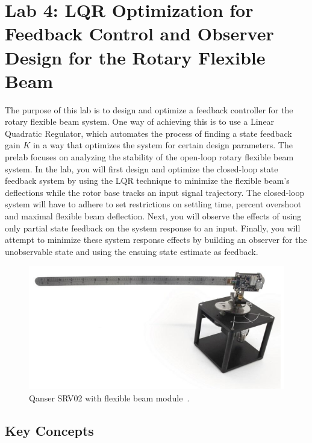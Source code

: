 \chapter{Lab 4: LQR Optimization for Feedback Control and Observer Design for the Rotary Flexible Beam}

The purpose of this lab is to design and optimize a feedback controller for the rotary flexible beam system. One way of achieving this is to use a Linear Quadratic Regulator, which automates the process of finding a state feedback gain $K$ in a way that optimizes the system for certain design parameters. The prelab focuses on analyzing the stability of the open-loop rotary flexible beam system. In the lab, you will first design and optimize the closed-loop state feedback system by using the LQR technique to minimize the flexible beam's deflections while the rotor base tracks an input signal trajectory. The closed-loop system will have to adhere to set restrictions on settling time, percent overshoot and maximal flexible beam deflection. Next, you will observe the effects of using only partial state feedback on the system response to an input. Finally, you will attempt to minimize these system response effects by building an observer for the unobservable state and using the ensuing state estimate as feedback.
\begin{figure}[htb!]
    \centering
    \includegraphics[width=.6\linewidth]{eps/lab_1/quanser.eps}
    \caption{Qanser SRV02 with flexible beam module~\cite{Q-Flex-Beam}.}
    \label{fig:lab4_plant}
\end{figure}

\section{Key Concepts}
